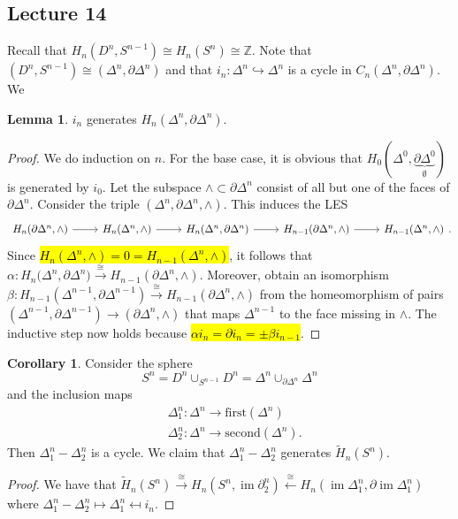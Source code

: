 \documentclass[10pt,letterpaper,cm]{nupset}
\theoremstyle{definition}
\theoremstyle{theorem}
\newtheorem{lemma}[definition]{Lemma}
\newtheorem{corollary}[definition]{Corollary}
\theoremstyle{remark}
\newcommand{\Z}{\mathbb Z}
\newcommand{\1}{\mathbb{1}}
\newcommand{\0}{\vec 0}
\DeclareMathOperator{\im}{im}
\begin{document}
\subsection{Lecture 14}

Recall that $H_n(D^n, S^{n-1}) \cong H_n(S^n) \cong \Z$. Note that $\left(D^n, S^{n-1}\right) \cong \left(\Delta^n, \partial{\Delta^n}\right)$ and that $i_n : \Delta^n \hookrightarrow \Delta^n$ is a cycle in $C_n(\Delta^n, \partial{\Delta^n})$. We

\begin{lemma}
$i_n$ generates $H_n(\Delta^n, \partial{\Delta^n})$.
\end{lemma}
\begin{proof}
We do induction on $n$. For the base case, it is obvious that $H_0(\Delta^0, \underbrace{\partial{\Delta^0}}_{\emptyset})$ is generated by $i_0$. Let the subspace $\wedge \subset \partial{\Delta^n}$ consist of all but one of the faces of $\partial{\Delta^n}$. Consider the triple $\left(\Delta^n, \partial{\Delta^n}, \wedge\right)$. This induces the LES
\[
\begin{tikzcd}
{H_n(\partial{\Delta^n, \wedge})} \arrow[r] & {H_n(\Delta^n, \wedge)} \arrow[r] & {H_n(\Delta^n, \partial{\Delta^n)}} \arrow[r] & {H_{n-1}(\partial{\Delta^n}, \wedge)} \arrow[r] & {H_{n-1}(\Delta^n, \wedge)}
\end{tikzcd}
.\] Since \hl{$H_n(\Delta^n, \wedge) =0 = H_{n-1}(\Delta^n, \wedge)$}, it follows that $\alpha: H_n(\Delta^n, \partial{\Delta^n)} \overset{\cong}{\longrightarrow}  H_{n-1}(\partial{\Delta^n}, \wedge)$. Moreover, obtain an isomorphism $\beta: H_{n-1}(\Delta^{n-1}, \partial{\Delta^{n-1}}) \overset{\cong}{\longrightarrow} H_{n-1}(\partial{\Delta^n}, \wedge)$ from the homeomorphism of pairs $\left(\Delta^{n-1}, \partial{\Delta^{n-1}}\right) \to \left(\partial{\Delta^n}, \wedge\right)$ that maps $\Delta^{n-1}$ to the face missing in $\wedge$. The inductive step now holds because \hl{$\alpha{i_n} = \partial{i_n}= \pm \beta{i_{n-1}}$}.
\end{proof}

\begin{corollary}
Consider the sphere $$S^n = D^n \cup_{S^{n-1}} D^n= \Delta^n \cup_{\partial{\Delta^n}}\Delta^n$$ and the inclusion maps 
\begin{align*}
& \Delta^n_1 :\Delta^n \to \text{first}(\Delta^n)
\\ &  \Delta^n_2 :\Delta^n \to \text{second}(\Delta^n).
\end{align*} Then $\Delta^n_1 - \Delta^n_2$ is a cycle. We claim that $\Delta_1^n -\Delta_2^n$ generates $\widetilde{H}_n(S^n)$.
\end{corollary}
\begin{proof}
We have that $\widetilde{H}_n(S^n) \overset{\cong}{\longrightarrow} H_n(S^n, \im{\partial_2^n}) \overset{\cong}{\longleftarrow} H_n(\im{\Delta^n_1}, \partial{\im{\Delta_1^n}})$ where $\Delta_1^n -\Delta_2^n \mapsto \Delta^n_1 \mapsfrom i_n$.
\end{proof}
\end{document}
